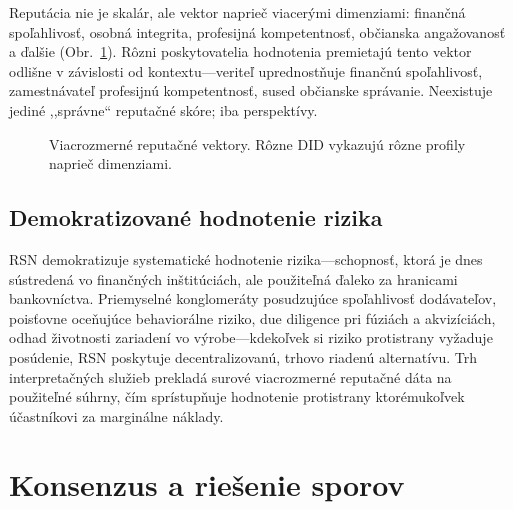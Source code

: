 \documentclass[11pt,a4paper,twocolumn]{article}
\begin{document}
Reputácia nie je skalár, ale vektor naprieč viacerými dimenziami: finančná spoľahlivosť, osobná integrita, profesijná kompetentnosť, občianska angažovanosť a ďalšie (Obr.~\ref{fig:reputation-radar}). Rôzni poskytovatelia hodnotenia premietajú tento vektor odlišne v závislosti od kontextu---veriteľ uprednostňuje finančnú spoľahlivosť, zamestnávateľ profesijnú kompetentnosť, sused občianske správanie. Neexistuje jediné ,,správne`` reputačné skóre; iba perspektívy.

\begin{figure}[ht]
\centering
{}
\caption{Viacrozmerné reputačné vektory. Rôzne DID vykazujú rôzne profily naprieč dimenziami.}
\label{fig:reputation-radar}
\end{figure}

\subsection{Demokratizované hodnotenie rizika}

RSN demokratizuje systematické hodnotenie rizika---schopnosť, ktorá je dnes sústredená vo finančných inštitúciách, ale použiteľná ďaleko za hranicami bankovníctva. Priemyselné konglomeráty posudzujúce spoľahlivosť dodávateľov, poisťovne oceňujúce behaviorálne riziko, due diligence pri fúziách a akvizíciách, odhad životnosti zariadení vo výrobe---kdekoľvek si riziko protistrany vyžaduje posúdenie, RSN poskytuje decentralizovanú, trhovo riadenú alternatívu. Trh interpretačných služieb prekladá surové viacrozmerné reputačné dáta na použiteľné súhrny, čím sprístupňuje hodnotenie protistrany ktorémukoľvek účastníkovi za marginálne náklady.

\section{Konsenzus a riešenie sporov}
\end{document}
